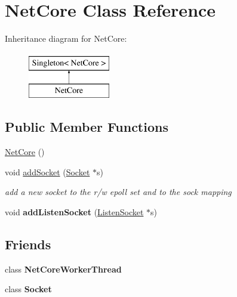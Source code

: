 \hypertarget{classNetCore}{\section{\-Net\-Core \-Class \-Reference}
\label{classNetCore}
}
\-Inheritance diagram for \-Net\-Core\-:\begin{figure}[H]
\begin{center}
\leavevmode
\includegraphics[height=2.000000cm]{classNetCore}
\end{center}
\end{figure}
\subsection*{\-Public \-Member \-Functions}
\begin{DoxyCompactItemize}
\item 
\hyperlink{classNetCore_ad10840be05aa99314c59ca10f067b2da}{\-Net\-Core} ()
\item 
void \hyperlink{classNetCore_a427f3577c790d9199e9e976172e32ea3}{add\-Socket} (\hyperlink{classSocket}{\-Socket} $\ast$s)
\begin{DoxyCompactList}\small\item\em add a new socket to the r/w epoll set and to the sock mapping \end{DoxyCompactList}\item 
\hypertarget{classNetCore_adae8b16fc82aed8f9b10ab4e431c886e}{void {\bfseries add\-Listen\-Socket} (\hyperlink{classListenSocket}{\-Listen\-Socket} $\ast$s)}\label{classNetCore_adae8b16fc82aed8f9b10ab4e431c886e}

\end{DoxyCompactItemize}
\subsection*{\-Friends}
\begin{DoxyCompactItemize}
\item 
\hypertarget{classNetCore_ae0585299ab7c2a563b1aeabf73ea2c21}{class {\bfseries \-Net\-Core\-Worker\-Thread}}\label{classNetCore_ae0585299ab7c2a563b1aeabf73ea2c21}

\item 
\hypertarget{classNetCore_ab510887d735ee73ab1cb598c66260e87}{class {\bfseries \-Socket}}\label{classNetCore_ab510887d735ee73ab1cb598c66260e87}

\end{DoxyCompactItemize}


